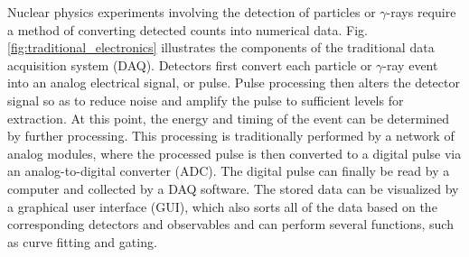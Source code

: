 Nuclear physics experiments involving the detection of particles or $\gamma$-rays require a method of converting detected counts into numerical data. 
Fig. \ref{fig:traditional_electronics} illustrates the components of the traditional data acquisition system (DAQ). Detectors first convert each particle or $\gamma$-ray event into an analog electrical signal, or pulse. Pulse processing then alters the detector signal so as to reduce noise and amplify the pulse to sufficient levels for extraction. At this point, the energy and timing of the event can be determined by further processing. This processing is traditionally performed by a network of analog modules, where the processed pulse is then converted to a digital pulse via an analog-to-digital converter (ADC). The digital pulse can finally be read by a computer and collected by a DAQ software. The stored data can be visualized by a graphical user interface (GUI), which also sorts all of the data based on the corresponding detectors and observables and can perform several functions, such as curve fitting and gating.

